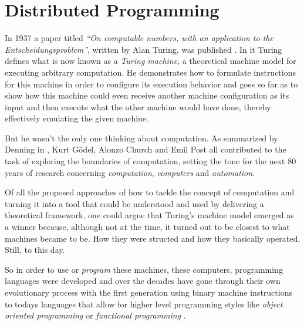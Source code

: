 \section{Distributed Programming}
\label{distributedprogramming}

In 1937 a paper titled \textit{``On computable numbers, with an
application to the Entscheidungsproblem''}, written by Alan Turing, was
published \cite{turingcomputable}. In it Turing defines what is now
known as a \textit{Turing machine}, a theoretical machine model for
executing arbitrary computation. He demonstrates how to formulate
instructions for this machine in order to configure its execution
behavior and goes so far as to show how this
machine could even receive another machine configuration as its input
and then execute what the other machine would have done, thereby
effectively emulating the given machine.

But he wasn't the only one thinking about computation. As summarized
by Denning in \cite{whatiscomputation}, Kurt Gödel, Alonzo Church and Emil
Post all contributed to the task of exploring the boundaries of
computation, setting the tone for the next 80 years of research
concerning \textit{computation}, \textit{computers} and \textit{automation}.
\newline


Of all the proposed approaches of how to tackle the concept of computation
and turning it into a tool that could be understood and used by delivering
a theoretical framework, one could argue that Turing's machine model
emerged as a winner because, although not at the time, it turned out
to be closest to what machines became to be. How they were structed and
how they basically operated. Still, to this day.

So in order to use or \textit{program} these machines, these computers,
programming languages were developed and over the decades have gone
through their own evolutionary process \cite{pl-gens} with the
first generation using binary machine instructions to todays languages
that allow for higher level programming styles like
\textit{object oriented programming } \cite{bjarneOO} or
\textit{functional programming} \cite{wadler-functional}.














































